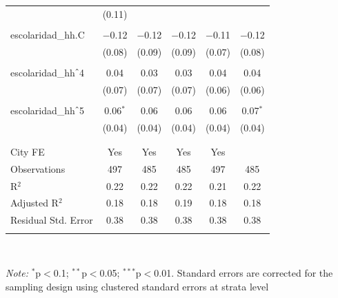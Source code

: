 \begin{table}[H]
\begin{tabularx}{0.9\textwidth}{@{\extracolsep{-7pt}}lccccc}
& (0.11) \\    & & & & & \\   escolaridad\_hh.C & $-$0.12 & $-$0.12 & $-$0.12 & $-$0.11 & $-$0.12 \\    & (0.08) & (0.09) & (0.09) & (0.07) & (0.08) \\    & & & & & \\   escolaridad\_hh$\hat{\mkern6mu}$4 & 0.04 & 0.03 & 0.03 & 0.04 & 0.04 \\    & (0.07) & (0.07) & (0.07) & (0.06) & (0.06) \\    & & & & & \\   escolaridad\_hh$\hat{\mkern6mu}$5 & 0.06$^{*}$ & 0.06 & 0.06 & 0.06 & 0.07$^{*}$ \\    & (0.04) & (0.04) & (0.04) & (0.04) & (0.04) \\    & & & & & \\  \hline \\[-1.8ex]  City FE & Yes & Yes & Yes & Yes &  \\  Observations & 497 & 485 & 485 & 497 & 485 \\  R$^{2}$ & 0.22 & 0.22 & 0.22 & 0.21 & 0.22 \\  Adjusted R$^{2}$ & 0.18 & 0.18 & 0.19 & 0.18 & 0.18 \\  Residual Std. Error & 0.38 & 0.38 & 0.38 & 0.38 & 0.38 \\  \hline  \hline \\[-1.8ex]  \end{tabularx} \\ \parbox[]{\textwidth}{\textit{Note:} $^{*}$p$<$0.1; $^{**}$p$<$0.05; $^{***}$p$<$0.01. Standard errors are corrected for the sampling design using clustered standard errors at strata level }  \end{table} 